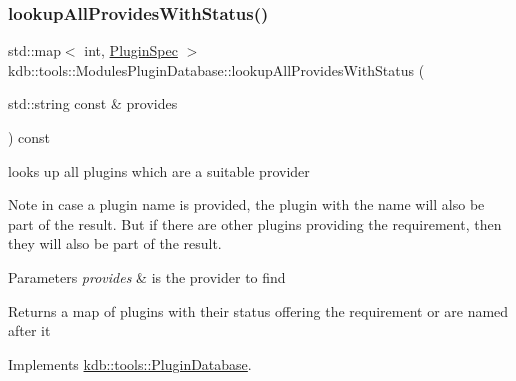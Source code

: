 \mbox{\label{classkdb_1_1tools_1_1ModulesPluginDatabase_abe19487ff2a2e0548288dfa2a5678ae1}} 
\subsubsection{\texorpdfstring{lookupAllProvidesWithStatus()}{lookupAllProvidesWithStatus()}}
{\footnotesize\ttfamily std\+::map$<$ int, \mbox{\hyperlink{classkdb_1_1tools_1_1PluginSpec}{Plugin\+Spec}} $>$ kdb\+::tools\+::\+Modules\+Plugin\+Database\+::lookup\+All\+Provides\+With\+Status (\begin{DoxyParamCaption}\item[{std\+::string const \&}]{provides }\end{DoxyParamCaption}) const\hspace{0.3cm}{\ttfamily [virtual]}}



looks up all plugins which are a suitable provider 

\begin{DoxyNote}{Note}
in case a plugin name is provided, the plugin with the name will also be part of the result. But if there are other plugins providing the requirement, then they will also be part of the result.
\end{DoxyNote}

\begin{DoxyParams}{Parameters}
{\em provides} & is the provider to find\\
\hline
\end{DoxyParams}
\begin{DoxyReturn}{Returns}
a map of plugins with their status offering the requirement or are named after it 
\end{DoxyReturn}


Implements \mbox{\hyperlink{classkdb_1_1tools_1_1PluginDatabase_aa918b547973f627a5604fa3b2b3faf30}{kdb\+::tools\+::\+Plugin\+Database}}.

\mbox{\label{classkdb_1_1tools_1_1ModulesPluginDatabase_a3f51beee8aecb4371e7d12e98958f875}} 
